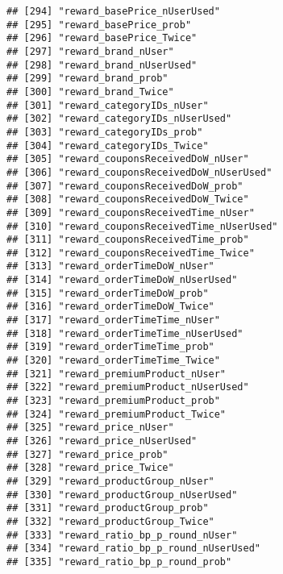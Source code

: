 \documentclass[10pt]{report}
\begin{document}
\begin{verbatim}
## [294] "reward_basePrice_nUserUsed"                         
## [295] "reward_basePrice_prob"                              
## [296] "reward_basePrice_Twice"                             
## [297] "reward_brand_nUser"                                 
## [298] "reward_brand_nUserUsed"                             
## [299] "reward_brand_prob"                                  
## [300] "reward_brand_Twice"                                 
## [301] "reward_categoryIDs_nUser"                           
## [302] "reward_categoryIDs_nUserUsed"                       
## [303] "reward_categoryIDs_prob"                            
## [304] "reward_categoryIDs_Twice"                           
## [305] "reward_couponsReceivedDoW_nUser"                    
## [306] "reward_couponsReceivedDoW_nUserUsed"                
## [307] "reward_couponsReceivedDoW_prob"                     
## [308] "reward_couponsReceivedDoW_Twice"                    
## [309] "reward_couponsReceivedTime_nUser"                   
## [310] "reward_couponsReceivedTime_nUserUsed"               
## [311] "reward_couponsReceivedTime_prob"                    
## [312] "reward_couponsReceivedTime_Twice"                   
## [313] "reward_orderTimeDoW_nUser"                          
## [314] "reward_orderTimeDoW_nUserUsed"                      
## [315] "reward_orderTimeDoW_prob"                           
## [316] "reward_orderTimeDoW_Twice"                          
## [317] "reward_orderTimeTime_nUser"                         
## [318] "reward_orderTimeTime_nUserUsed"                     
## [319] "reward_orderTimeTime_prob"                          
## [320] "reward_orderTimeTime_Twice"                         
## [321] "reward_premiumProduct_nUser"                        
## [322] "reward_premiumProduct_nUserUsed"                    
## [323] "reward_premiumProduct_prob"                         
## [324] "reward_premiumProduct_Twice"                        
## [325] "reward_price_nUser"                                 
## [326] "reward_price_nUserUsed"                             
## [327] "reward_price_prob"                                  
## [328] "reward_price_Twice"                                 
## [329] "reward_productGroup_nUser"                          
## [330] "reward_productGroup_nUserUsed"                      
## [331] "reward_productGroup_prob"                           
## [332] "reward_productGroup_Twice"                          
## [333] "reward_ratio_bp_p_round_nUser"                      
## [334] "reward_ratio_bp_p_round_nUserUsed"                  
## [335] "reward_ratio_bp_p_round_prob"                       

\end{verbatim}
\end{document}

